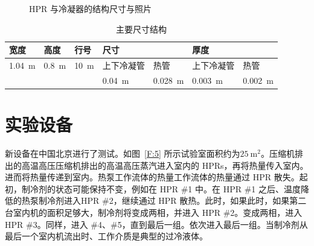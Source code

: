 \begin{figure}[h]
\centering  %
\caption{HPR 与冷凝器的结构尺寸与照片}
\label{F:4}
\end{figure}

\begin{table}[ht]
\centering
\caption{主要尺寸结构}
\begin{tabular}{@{}lllllll@{}}
\toprule
宽度   & 高度  & 行号 & 尺寸    &       & 厚度    &       \\ \midrule
\qty{1.04}{\m} & \qty{0.8}{\m} & \qty{10}{\m} & 上下冷凝管 & 热管    & 上下冷凝管 & 热管    \\
     &     &    & \qty{0.04}{\m}   & \qty{0.028}{\m} & \qty{0.003}{\m} & \qty{0.002}{\m}  \\ \bottomrule
\end{tabular}
\label{T:1}
\end{table}

\section{实验设备}
新设备在中国北京进行了测试。如图~\ref{F:5} 所示试验室面积约为$\qty{25}{\m^2} $。压缩机排出的高温高压压缩机排出的高温高压蒸汽进入室内的 HPRs，再将热量传入室内。进而将热量传递到室内。热泵工作流体的热量工作流体的热量通过 HPR 散失。起初，制冷剂的状态可能保持不变，例如在 HPR \#1 中。在 HPR \#1 之后、温度降低的热泵制冷剂进入HPR \#2，继续通过 HPR 散热。此时，如果此时，如果第二台室内机的面积足够大，制冷剂将变成两相，并进入 HPR \#2。变成两相，进入 HPR \#3。同样，进入 \#4、\#5，直到最后一组。依次进入最后一组。当制冷剂从最后一个室内机流出时、工作介质是典型的过冷液体。

